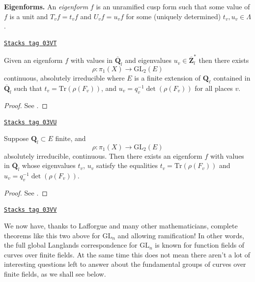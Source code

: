 \medskip\noindent
{\bf Eigenforms.} An {\it eigenform} $f$ is an unramified cusp form
such that some value of $f$ is a unit and $T_vf = t_vf$ and
$U_vf = u_vf$ for some (uniquely determined) $t_v, u_v \in \Lambda$.

\begin{theorem}
\label{trace-theorem-drinfeld-make-rho}
\href{https://stacks.math.columbia.edu/tag/03VT}{\texttt{Stacks tag 03VT}}

Given an eigenform $f$ with values in
$\overline{\mathbf{Q}}_l$ and eigenvalues
$u_v\in \overline{\mathbf{Z}}_l^*$ then there exists
$$
\rho : \pi_1(X)\to \text{GL}_2(E)
$$
continuous, absolutely irreducible where
$E$ is a finite extension of $\mathbf{Q}_\ell$ contained in
$\overline{\mathbf{Q}}_l$ such that
$t_v = \text{Tr}(\rho(F_v))$, and
$u_v = q_v^{-1}\det\left(\rho(F_v)\right)$ for all places $v$.
\end{theorem}

\begin{proof}
See \cite{D0}.
\end{proof}

\begin{theorem}
\label{trace-theorem-drinfeld-make-f}
\href{https://stacks.math.columbia.edu/tag/03VU}{\texttt{Stacks tag 03VU}}

Suppose $\mathbf{Q}_l \subset E$ finite, and
$$
\rho : \pi_1(X)\to \text{GL}_2(E)
$$
absolutely irreducible, continuous. Then there exists an eigenform $f$ with
values in $\overline{\mathbf{Q}}_l$ whose eigenvalues $t_v$, $u_v$
satisfy the equalities
$t_v = \text{Tr}(\rho(F_v))$ and $u_v = q_v^{-1}\det(\rho(F_v))$.
\end{theorem}

\begin{proof}
See \cite{D1}.
\end{proof}

\begin{remark}[Lafforgue]
\label{trace-remark-lafforgue}
\href{https://stacks.math.columbia.edu/tag/03VV}{\texttt{Stacks tag 03VV}}

We now have, thanks to Lafforgue and many other mathematicians,
complete theorems like this two above for $\text{GL}_n$
and allowing ramification!
In other words, the full global Langlands correspondence for $\text{GL}_n$
is known for function fields of curves over finite fields. At the same
time this does not mean there aren't a lot of interesting questions left
to answer about the fundamental groups of curves over finite fields, as
we shall see below.
\end{remark}

